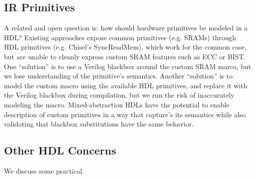 \documentclass[sigplan,review,nonacm]{acmart}
\begin{document}
\subsection{IR Primitives}


A related and open question is: how should hardware primitives be modeled in a HDL?
Existing approaches expose common primitives (e.g. SRAMs) through HDL primitives (e.g. Chisel's SyncReadMem), which work for the common case, but are unable to cleanly express custom SRAM features such as ECC or BIST.
One ``solution'' is to use a Verilog blackbox around the custom SRAM marco, but we lose understanding of the primitive's semantics.
Another ``solution'' is to model the custom macro using the available HDL primitives, and replace it with the Verilog blackbox during compilation, but we run the risk of inaccurately modeling the macro.
Mixed-abstraction HDLs have the potential to enable description of custom primitives in a way that capture's its semantics while also validating that blackbox substitutions have the same behavior.

\subsection{Other HDL Concerns}

We discuss some practical 




%
%
%
\end{document}
